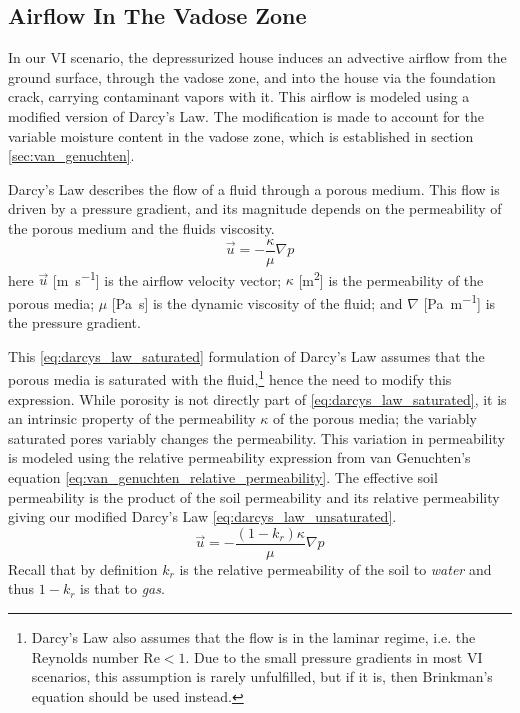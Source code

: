\subsection{Airflow In The Vadose Zone}\label{sec:darcys_law}

In our VI scenario, the depressurized house induces an advective airflow from the ground surface, through the vadose zone, and into the house via the foundation crack, carrying contaminant vapors with it.
This airflow is modeled using a modified version of Darcy's Law.
The modification is made to account for the variable moisture content in the vadose zone, which is established in section \ref{sec:van_genuchten}.\par

Darcy's Law describes the flow of a fluid through a porous medium.
This flow is driven by a pressure gradient, and its magnitude depends on the permeability of the porous medium and the fluids viscosity.
\begin{equation}\label{eq:darcys_law_saturated}
  \vec{u} = -\frac{\kappa}{\mu} \nabla p
\end{equation}
here $\vec{u}$ [\si{\m\per\second}] is the airflow velocity vector;
$\kappa$ [\si{\metre\squared}] is the permeability of the porous media;
$\mu$ [\si{\pascal\second}] is the dynamic viscosity of the fluid;
and $\nabla$ [\si{\pascal\per\metre}] is the pressure gradient.\par

This \eqref{eq:darcys_law_saturated} formulation of Darcy's Law assumes that the porous media is saturated with the fluid,\footnote{Darcy's Law also assumes that the flow is in the laminar regime, i.e. the Reynolds number $\mathrm{Re} < 1$.
Due to the small pressure gradients in most VI scenarios, this assumption is rarely unfulfilled, but if it is, then Brinkman's equation should be used instead.} %
hence the need to modify this expression.
While porosity is not directly part of \eqref{eq:darcys_law_saturated}, it is an intrinsic property of the permeability $\kappa$ of the porous media; the variably saturated pores variably changes the permeability.
This variation in permeability is modeled using the relative permeability expression from van Genuchten's equation \eqref{eq:van_genuchten_relative_permeability}.
The effective soil permeability is the product of the soil permeability and its relative permeability giving our modified Darcy's Law \eqref{eq:darcys_law_unsaturated}.
\begin{equation}\label{eq:darcys_law_unsaturated}
  \vec{u} = -\frac{(1-k_r)\kappa}{\mu} \nabla p
\end{equation}
Recall that by definition $k_r$ is the relative permeability of the soil to \textit{water} and thus $1-k_r$ is that to \textit{gas}.\par

